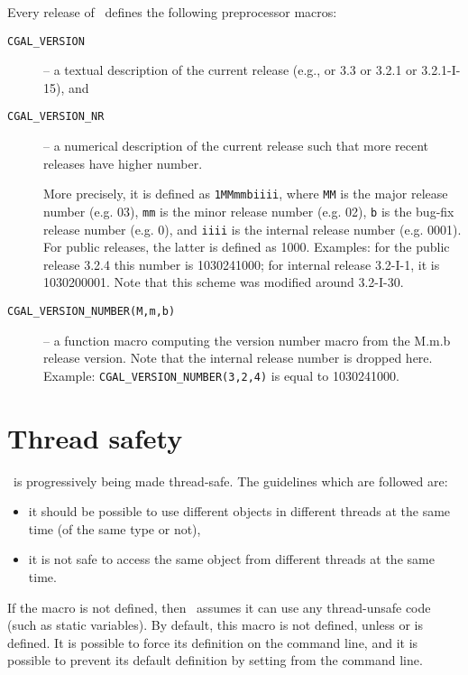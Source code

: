 Every release of \cgal\ defines the following preprocessor macros:
\begin{description}
\item[\texttt{CGAL\_VERSION}]
     -- a textual description of the current release
        (e.g., or 3.3 or 3.2.1 or 3.2.1-I-15), and 
\item[\texttt{CGAL\_VERSION\_NR}]
     -- a numerical description of the current release such that
        more recent releases have higher number.

     More precisely, it is defined as \texttt{1MMmmbiiii},
     where \texttt{MM} is the major release number (e.g. 03),
     \texttt{mm} is the minor release number (e.g. 02),
     \texttt{b} is the bug-fix release number (e.g. 0), and
     \texttt{iiii} is the internal release number (e.g. 0001). For
     public releases, the latter is defined as 1000.
     Examples: for the public release 3.2.4 this number is 
     1030241000; for internal release 3.2-I-1, it is 1030200001.
     Note that this scheme was modified around 3.2-I-30.
\item[\texttt{CGAL\_VERSION\_NUMBER(M,m,b)}]
     -- a function macro computing the version number macro
     from the M.m.b release version.  Note that the internal release
     number is dropped here.  Example: \texttt{CGAL\_VERSION\_NUMBER(3,2,4)}
     is equal to 1030241000.
\end{description}
 

\section{Thread safety}

\cgal\ is progressively being made thread-safe.  The guidelines which are followed
are:
\begin{itemize}
\item it should be possible to use different objects in different threads at
the same time (of the same type or not),
\item it is not safe to access the same object from different threads
at the same time.
\end{itemize}

If the macro  is not defined, then \cgal\ assumes it can use
any thread-unsafe code (such as static variables).  By default, this macro is not
defined, unless  or  is defined.  It is possible
to force its definition on the command line, and it is possible to prevent its default
definition by setting  from the command line.


